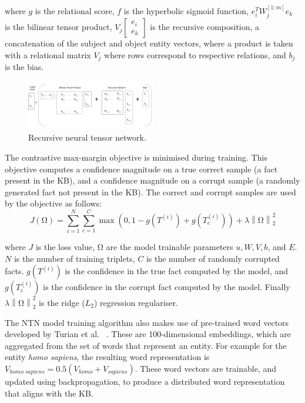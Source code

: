 \noindent where $g$ is the relational score, $f$ is the hyperbolic sigmoid function, $e_i^TW_j^{\left [1:m \right ]} e_k $ is the bilinear tensor product, $V_j \left [ \begin{matrix} e_i \\ e_k \end{matrix} \right ]$ is the recursive composition, a concatenation of the subject and object entity vectors, where a product is taken with a relational matrix $ V_j $ where rows correspond to respective relations, and $ b_j $ is the bias. \par

\begin{figure}[H]
   	\centering
    	\includegraphics[width=0.5\textwidth, height=0.3\textwidth]{recursive_neural_tensor_network.png}
	\caption{Recursive neural tensor network.}
\end{figure}

\noindent The contrastive max-margin objective is minimised during training. This objective computes a confidence magnitude on a true correct sample (a fact present in the KB), and a confidence magnitude on a corrupt sample (a randomly generated fact not present in the KB). The correct and corrupt samples are used by the objective as follows:
\begin{equation}
	J(\si{\ohm}) =  \sum_{i=1}^N \sum_{c=1}^C \max(0,1 - g(T^{(i)}) + g(T_c^{(i)})) + \lambda \left \lVert \si{\ohm} \right \rVert_2^2
\end{equation}

\noindent where $J$ is the loss value, $\si{\ohm}$ are the model trainable parameters $u, W, V, b $, and $ E $. $N$ is the number of training triplets, $C$ is the number of randomly corrupted facts. $ g(T^{(i)}) $ is the confidence in the true fact computed by the model, and $ g(T_c^{(i)}) $ is the confidence in the corrupt fact computed by the model. Finally $\lambda\left\lVert \si{\ohm} \right\rVert_2^2$ is the ridge ($L_2$) regression regulariser. \par

\noindent The NTN model training algorithm also makes use of pre-trained word vectors developed by Turian et al. \unskip ~\citep{turian2010word}. These are 100-dimensional embeddings, which are aggregated from the set of words that represent an entity. For example for the entity \textit{homo sapiens}, the resulting word representation is $V_{homo \; sapiens} = 0.5(V_{homo} + V_{sapiens})$. These word vectors are trainable, and updated using backpropagation, to produce a distributed word representation that aligns with the KB. \par

